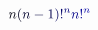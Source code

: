 \documentclass[12pt]{article}
\begin{document}
\makeatletter
\renewcommand*{\@textcolor}[3]{%
  \protect\leavevmode
  \begingroup
    \color#1{#2}#3%
  \endgroup
}
\makeatother
\begin{displaymath}
\mathcolor[RGB]{0,0,15}{n} \mathcolor[RGB]{0,0,30}{(} \mathcolor[RGB]{0,0,45}{n} \mathcolor[RGB]{0,0,60}{-} \mathcolor[RGB]{0,0,75}{1} \mathcolor[RGB]{0,0,90}{)} \mathcolor[RGB]{0,0,105}{!} ^ { \mathcolor[RGB]{0,0,120}{n} } \mathcolor[RGB]{0,0,135}{n} \mathcolor[RGB]{0,0,150}{!} ^ { \mathcolor[RGB]{0,0,165}{n} }
\end{displaymath}
\end{document}
